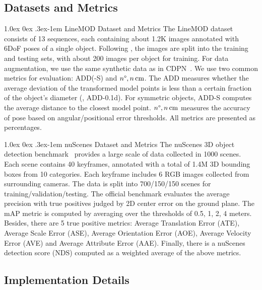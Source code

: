 \documentclass[10pt,twocolumn,letterpaper]{article}
\makeatletter
\renewcommand{\paragraph}{
  \@startsection{paragraph}{4}
  {\z@}{1.0ex \@plus 0ex \@minus .3ex}{-1em}
  {\normalfont\normalsize\bfseries}
}
\makeatother
\begin{document}
\subsection{Datasets and Metrics}
\paragraph{LineMOD Dataset and Metrics}
The LineMOD dataset~\cite{linemod} consists of 13 sequences, each containing about 1.2K images annotated with 6DoF poses of a single object. Following \cite{Brachmann_2016_CVPR}, the images are split into the training and testing sets, with about 200 images per object for training. For data augmentation, we use the same synthetic data as in CDPN~\cite{CDPN}.
We use two common metrics for evaluation: ADD(-S) and $n\text{\textdegree}, n\,\text{cm}$. The ADD measures whether the average deviation of the transformed model points is less than a certain fraction of the object’s diameter (\eg, ADD-0.1d). For symmetric objects, ADD-S computes the average distance to the closest model point. $n\text{\textdegree}, n\,\text{cm}$ measures the accuracy of pose based on angular/positional error thresholds. All metrics are presented as percentages.



\paragraph{nuScenes Dataset and Metrics}
The nuScenes 3D object detection benchmark~\cite{nuscenes} provides a large scale of data collected in 1000 scenes.
Each scene contains 40 keyframes, annotated with a total of 1.4M 3D bounding boxes from 10 categories.
Each keyframe includes 6 RGB images collected from surrounding cameras. The data is split into 700/150/150 scenes for training/validation/testing. The official benchmark evaluates the average precision with true positives judged by 2D center error on the ground plane.
The mAP metric is computed by averaging over the thresholds of 0.5, 1, 2, 4 meters. Besides, there are 5 true positive metrics: Average Translation Error (ATE),
Average Scale Error (ASE),
Average Orientation Error (AOE),
Average Velocity Error (AVE)
and Average Attribute Error (AAE).
Finally, there is a nuScenes detection score (NDS) computed as a weighted average of the above metrics. 

\subsection{Implementation Details} \label{implementation}
\end{document}
